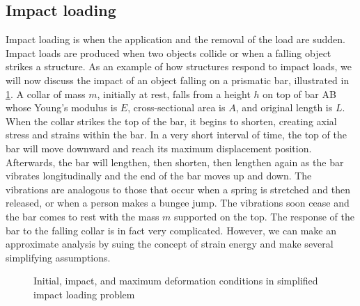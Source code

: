 \documentclass[
10pt,
a4paper,
openany,
svgnames,
]{kaobook} %
\begin{document}
\subsection{Impact loading}

Impact loading is when the application and the removal of the load are sudden. Impact loads are produced when two objects collide or when a falling object strikes a structure. As an example of how structures respond to impact loads, we will now discuss the impact of an object falling on a prismatic bar, illustrated in \cref{fig: impact loading}. A collar of mass $m$, initially at rest, falls from a height $h$ on top of bar AB whose Young's modulus is $E$, cross-sectional area is $A$, and original length is $L$. When the collar strikes the top of the bar, it begins to shorten, creating axial stress and strains within the bar. In a very short interval of time, the top of the bar will move downward and reach its maximum displacement position. Afterwards, the bar will lengthen, then shorten, then lengthen again as the bar vibrates longitudinally and the end of the bar moves up and down. The vibrations are analogous to those that occur when a spring is stretched and then released, or when a person makes a bungee jump. The vibrations soon cease and the bar comes to rest with the mass $m$ supported on the top. The response of the bar to the falling collar is in fact very complicated. However, we can make an approximate analysis by suing the concept of strain energy and make several simplifying assumptions.

\begin{figure}[h]
  \centering
  \caption{Initial, impact, and maximum deformation conditions in simplified impact loading problem}
  \label{fig: impact loading}
  \end{figure}
\end{document}
